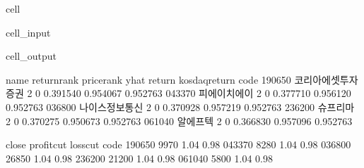 \documentclass[letterpaper,10pt,english]{jupyterBook}
\begin{document}
\begin{sphinxuseclass}{cell}\begin{sphinxVerbatimInput}

\begin{sphinxuseclass}{cell_input}
\begin{sphinxVerbatim}[commandchars=\\\{\}]
\end{sphinxVerbatim}

\end{sphinxuseclass}\end{sphinxVerbatimInput}
\begin{sphinxVerbatimOutput}

\begin{sphinxuseclass}{cell_output}
\begin{sphinxVerbatim}[commandchars=\\\{\}]
             name return\PYGZus{}rank price\PYGZus{}rank      yhat    return  kosdaq\PYGZus{}return  \PYGZbs{}
code                                                                          
190650  코리아에셋투자증권           2          0  0.391540  0.954067       0.952763   
043370     피에이치에이           2          0  0.377710  0.956120       0.952763   
036800    나이스정보통신           2          0  0.370928  0.957219       0.952763   
236200       슈프리마           2          0  0.370275  0.950673       0.952763   
061040       알에프텍           2          0  0.366830  0.957096       0.952763   

        close  profit\PYGZus{}cut  loss\PYGZus{}cut  
code                                 
190650   9970        1.04      0.98  
043370   8280        1.04      0.98  
036800  26850        1.04      0.98  
236200  21200        1.04      0.98  
061040   5800        1.04      0.98  
\end{sphinxVerbatim}

\end{sphinxuseclass}\end{sphinxVerbatimOutput}

\end{sphinxuseclass}
\end{document}
